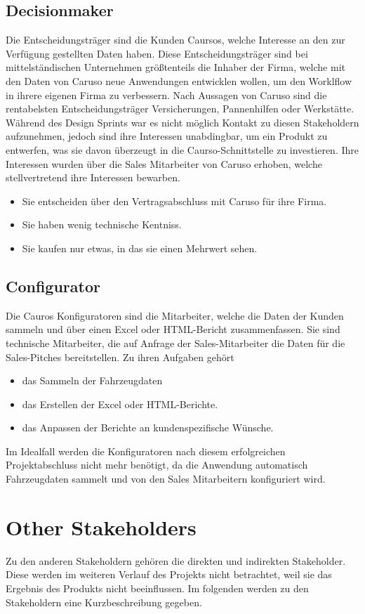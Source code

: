 \subsection{Decisionmaker}
Die Entscheidungsträger sind die Kunden Caursos, welche Interesse an den zur Verfügung gestellten Daten haben. Diese Entscheidungsträger sind bei mittelständischen Unternehmen größtenteils die Inhaber der Firma, welche mit den Daten von Caruso neue Anwendungen entwicklen wollen, um den Worklflow in ihrere eigenen Firma zu verbessern. Nach Aussagen von Caruso sind die rentabelsten Entscheidungsträger Versicherungen, Pannenhilfen oder Werkstätte. Während des Design Sprints war es nicht möglich Kontakt zu diesen Stakeholdern aufzunehmen, jedoch sind ihre Interessen unabdingbar, um ein Produkt zu entwerfen, was sie davon überzeugt in die Caurso-Schnittstelle zu investieren. Ihre Interessen wurden über die Sales Mitarbeiter von Caruso erhoben, welche stellvertretend ihre Interessen bewarben.
\begin{itemize}
  \item Sie entscheiden über den Vertragsabschluss mit Caruso für ihre Firma.
  \item Sie haben wenig technische Kentniss.
  \item Sie kaufen nur etwas, in das sie einen Mehrwert sehen.
\end{itemize}

\subsection{Configurator}
Die Cauros Konfiguratoren sind die Mitarbeiter, welche die Daten der Kunden sammeln und über einen Excel oder HTML-Bericht zusammenfassen. Sie sind technische Mitarbeiter, die auf Anfrage der Sales-Mitarbeiter die Daten für die Sales-Pitches bereitstellen. Zu ihren Aufgaben gehört
\begin{itemize}
  \item das Sammeln der Fahrzeugdaten
  \item das Erstellen der Excel oder HTML-Berichte.
  \item das Anpassen der Berichte an kundenspezifische Wünsche.
\end{itemize}
Im Idealfall werden die Konfiguratoren nach diesem erfolgreichen Projektabschluss nicht mehr benötigt, da die Anwendung automatisch Fahrzeugdaten sammelt und von den Sales Mitarbeitern konfiguriert wird.

\section{Other Stakeholders}
Zu den anderen Stakeholdern gehören die direkten und indirekten Stakeholder. Diese werden im weiteren Verlauf des Projekts nicht betrachtet, weil sie das Ergebnis des Produkts nicht beeinflussen. Im folgenden werden zu den Stakeholdern eine Kurzbeschreibung gegeben.

